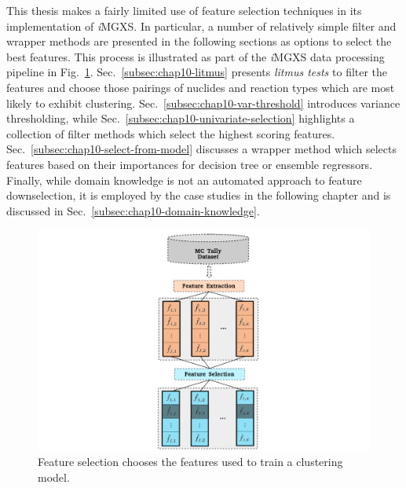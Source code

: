 This thesis makes a fairly limited use of feature selection techniques in its implementation of \textit{i}\ac{MGXS}. In particular, a number of relatively simple filter and wrapper methods are presented in the following sections as options to select the best features. This process is illustrated as part of the \textit{i}\ac{MGXS} data processing pipeline in Fig.~\ref{fig:chap10-select}. Sec.~\ref{subsec:chap10-litmus} presents \textit{litmus tests} to filter the features and choose those pairings of nuclides and reaction types which are most likely to exhibit clustering. Sec.~\ref{subsec:chap10-var-threshold} introduces variance thresholding, while Sec.~\ref{subsec:chap10-univariate-selection} highlights a collection of filter methods which select the highest scoring features. Sec.~\ref{subsec:chap10-select-from-model} discusses a wrapper method which selects features based on their importances for decision tree or ensemble regressors. Finally, while domain knowledge is not an automated approach to feature downselection, it is employed by the case studies in the following chapter and is discussed in Sec.~\ref{subsec:chap10-domain-knowledge}.


\begin{figure}[h!]
\centering
\includegraphics[width=0.95\linewidth]{figures/unsupervised/features/engineering/select}
\vspace{2mm}
\caption[\textit{i}MGXS feature selection]{Feature selection chooses the features used to train a clustering model.}
\label{fig:chap10-select}
\end{figure}

